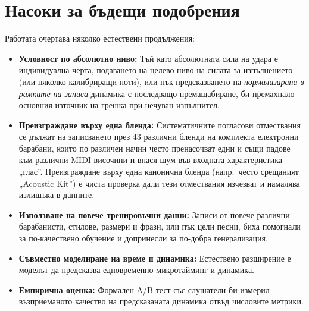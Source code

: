 \section{Насоки за бъдещи подобрения}
\label{sec:budeshti}

Работата очертава няколко естествени продължения:
\begin{itemize}
  \item \textbf{Условност по абсолютно ниво:} Тъй като абсолютната сила на
        удара е индивидуална черта, подаването на целево ниво на силата за
        изпълнението (или няколко калибриращи ноти), или пък предсказването на
        \emph{нормализирана в рамките на записа} динамика с последващо
        премащабиране, би премахнало основния източник на грешка при нечуван
        изпълнител.
  \item \textbf{Преизграждане върху една бленда:} Систематичните погласови
        отмествания се дължат на записването през 43 различни бленди на комплекта
        електронни барабани, които по различен начин често пренасочват
        едни и същи падове към различни MIDI височини и внася шум във входната характеристика
        „глас''. Преизграждане върху една
        канонична бленда (напр.\ често срещаният „Acoustic Kit'') е чиста проверка дали тези
        отмествания изчезват и намалява излишъка в данните.
  \item \textbf{Използване на повече тренировъчни данни:} Записи от повече различни барабанисти,
        стилове, размери и фрази, или пък цели песни, биха помогнали за по-качествено обучение
        и допринесли за по-добра генерализация.
  \item \textbf{Съвместно моделиране на време и динамика:} Естествено разширение е
        моделът да предсказва едновременно микротайминг и динамика.
  \item \textbf{Емпирична оценка:} Формален A/B тест със слушатели би измерил
        възприеманото качество на предсказаната динамика отвъд числовите метрики.
\end{itemize}
